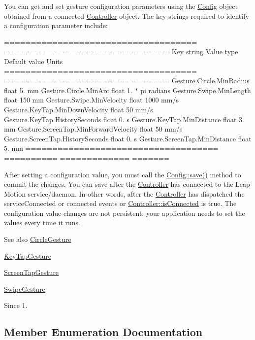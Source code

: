 You can get and set gesture configuration parameters using the \hyperlink{class_leap_1_1_config}{Config} object obtained from a connected \hyperlink{class_leap_1_1_controller}{Controller} object. The key strings required to identify a configuration parameter include\+:

==================================== ========== ============= ======= Key string Value type Default value Units ==================================== ========== ============= ======= Gesture.\+Circle.\+Min\+Radius float 5. mm Gesture.\+Circle.\+Min\+Arc float 1. $\ast$ pi radians Gesture.\+Swipe.\+Min\+Length float 150 mm Gesture.\+Swipe.\+Min\+Velocity float 1000 mm/s Gesture.\+Key\+Tap.\+Min\+Down\+Velocity float 50 mm/s Gesture.\+Key\+Tap.\+History\+Seconds float 0. s Gesture.\+Key\+Tap.\+Min\+Distance float 3. mm Gesture.\+Screen\+Tap.\+Min\+Forward\+Velocity float 50 mm/s Gesture.\+Screen\+Tap.\+History\+Seconds float 0. s Gesture.\+Screen\+Tap.\+Min\+Distance float 5. mm ==================================== ========== ============= ======= 

After setting a configuration value, you must call the \hyperlink{class_leap_1_1_config_ae1187e2b9992706d2a3eb071cc2f71c4}{Config\+::save()} method to commit the changes. You can save after the \hyperlink{class_leap_1_1_controller}{Controller} has connected to the Leap Motion service/daemon. In other words, after the \hyperlink{class_leap_1_1_controller}{Controller} has dispatched the service\+Connected or connected events or \hyperlink{class_leap_1_1_controller_a38835f744f2c56ae8914378b75085f14}{Controller\+::is\+Connected} is true. The configuration value changes are not persistent; your application needs to set the values every time it runs.

\begin{DoxySeeAlso}{See also}
\hyperlink{class_leap_1_1_circle_gesture}{Circle\+Gesture} 

\hyperlink{class_leap_1_1_key_tap_gesture}{Key\+Tap\+Gesture} 

\hyperlink{class_leap_1_1_screen_tap_gesture}{Screen\+Tap\+Gesture} 

\hyperlink{class_leap_1_1_swipe_gesture}{Swipe\+Gesture} 
\end{DoxySeeAlso}
\begin{DoxySince}{Since}
1. 
\end{DoxySince}


\subsection{Member Enumeration Documentation}
\mbox{\label{class_leap_1_1_config_aee9819af7eacacc324aa72619310a9d8}} 
